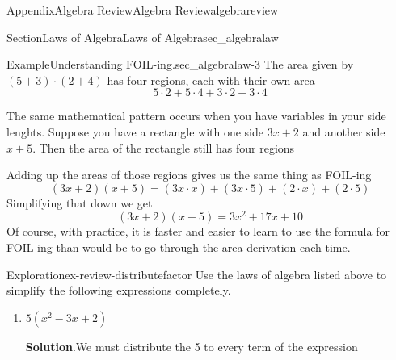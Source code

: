 \documentclass{tufte-book}
\newcommand{\blocktitlefont}{\relax}
\numberwithin{equation}{chapter}
\begin{document}
\begin{appendixptx}{Appendix}{Algebra Review}{}{Algebra Review}{}{}{algebrareview}
\begin{sectionptx}{Section}{Laws of Algebra}{}{Laws of Algebra}{}{}{sec_algebralaw}
\begin{example}{Example}{Understanding FOIL-ing.}{sec_algebralaw-3}
The area given by \((5+3)\cdot(2+4)\) has four regions, each with their own area%
\begin{equation*}
5\cdot 2 + 5\cdot 4 + 3 \cdot 2 + 3\cdot 4
\end{equation*}
%
\par
The same mathematical pattern occurs when you have variables in your side lenghts.  Suppose you have a rectangle with one side \(3x + 2\) and another side \(x+5\).  Then the area of the rectangle still has four regions%
\begin{image}{0.17}{0.66}{0.17}{}%
%
\end{image}%
Adding up the areas of those regions gives us the same thing as FOIL-ing%
\begin{equation*}
(3x+2)(x+5) = (3x\cdot x) + (3x\cdot 5) + (2\cdot x) + (2\cdot 5)
\end{equation*}
Simplifying that down we get%
\begin{equation*}
(3x+2)(x+5) = 3x^2 + 17x + 10
\end{equation*}
Of course, with practice, it is faster and easier to learn to use the formula for FOIL-ing than would be to go through the area derivation each time.%
\end{example}
\begin{exploration}{Exploration}{}{ex-review-distributefactor}%
Use the laws of algebra listed above to simplify the following expressions completely.%
\begin{enumerate}[font=\bfseries,label=(\alph*),ref=\alph*]%
\item{}\(5(x^2 - 3x + 2)\)%
\par\smallskip%
\noindent\textbf{\blocktitlefont Solution}.\hypertarget{ex-review-distributefactor-2-2}{}\quad{}We must distribute the 5 to every term of the expression%

\end{enumerate}
\end{exploration}
\end{sectionptx}
\end{appendixptx}
\end{document}
